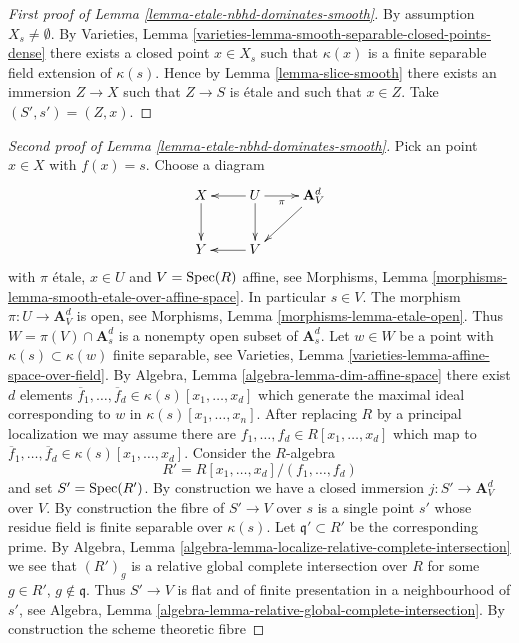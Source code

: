 \begin{proof}[First proof of Lemma \ref{lemma-etale-nbhd-dominates-smooth}]
By assumption $X_s \not = \emptyset$. By
Varieties, Lemma \ref{varieties-lemma-smooth-separable-closed-points-dense}
there exists a closed point $x \in X_s$ such that $\kappa(x)$
is a finite separable field extension of $\kappa(s)$.
Hence by
Lemma \ref{lemma-slice-smooth}
there exists an immersion $Z \to X$ such that $Z \to S$ is \'etale and such
that $x \in Z$. Take $(S' , s') = (Z, x)$.
\end{proof}

\begin{proof}[Second proof of Lemma \ref{lemma-etale-nbhd-dominates-smooth}]
Pick an point $x \in X$ with $f(x) = s$.
Choose a diagram
$$
\xymatrix{
X \ar[d] & U \ar[l] \ar[d] \ar[r]_-\pi & \mathbf{A}^d_V \ar[ld] \\
Y & V \ar[l]
}
$$
with $\pi$ \'etale, $x \in U$ and $V = \mathop{\rm Spec}(R)$ affine, see
Morphisms, Lemma \ref{morphisms-lemma-smooth-etale-over-affine-space}.
In particular $s \in V$. The morphism
$\pi : U \to \mathbf{A}^d_V$ is open, see
Morphisms, Lemma \ref{morphisms-lemma-etale-open}.
Thus $W = \pi(V) \cap \mathbf{A}^d_s$ is a nonempty open subset of
$\mathbf{A}^d_s$. Let $w \in W$ be a point with $\kappa(s) \subset \kappa(w)$
finite separable, see
Varieties, Lemma \ref{varieties-lemma-affine-space-over-field}.
By
Algebra, Lemma \ref{algebra-lemma-dim-affine-space}
there exist $d$ elements
$\overline{f}_1, \ldots, \overline{f}_d \in \kappa(s)[x_1, \ldots, x_d]$
which generate the maximal ideal corresponding to $w$ in
$\kappa(s)[x_1, \ldots, x_n]$.
After replacing $R$ by a principal localization
we may assume there are $f_1, \ldots, f_d \in R[x_1, \ldots, x_d]$
which map to
$\overline{f}_1, \ldots, \overline{f}_d \in \kappa(s)[x_1, \ldots, x_d]$.
Consider the $R$-algebra
$$
R' = R[x_1, \ldots, x_d]/(f_1, \ldots, f_d)
$$
and set $S' = \mathop{\rm Spec}(R')$. By construction we have a closed
immersion $j : S' \to \mathbf{A}^d_V$ over $V$.
By construction the fibre of $S' \to V$ over $s$ is a single
point $s'$ whose residue field is finite separable over $\kappa(s)$.
Let $\mathfrak q' \subset R'$ be the corresponding prime. By
Algebra, Lemma \ref{algebra-lemma-localize-relative-complete-intersection}
we see that $(R')_g$ is a relative global complete intersection over $R$
for some $g \in R'$, $g \not \in \mathfrak q$.
Thus $S' \to V$ is flat and of finite presentation in a
neighbourhood of $s'$, see
Algebra, Lemma \ref{algebra-lemma-relative-global-complete-intersection}.
By construction the scheme theoretic fibre

\end{proof}
